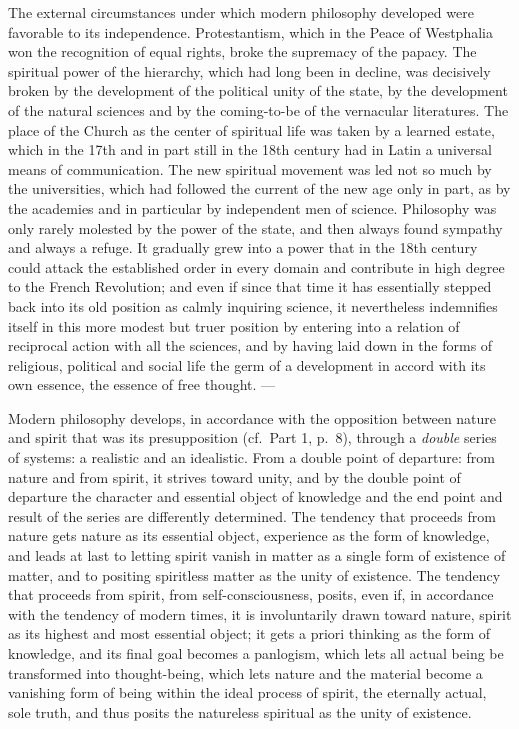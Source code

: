 The external circumstances under which modern philosophy developed were
favorable to its independence. Protestantism, which in the Peace of
Westphalia won the recognition of equal rights, broke the supremacy of
the papacy. The spiritual power of the hierarchy, which had long been in
decline, was decisively broken by the development of the political unity
of the state, by the development of the natural sciences and by the
coming-to-be of the vernacular literatures. The place of the Church as
the center of spiritual life was taken by a learned estate, which in the
17th and in part still in the 18th century had in Latin a universal
means of communication. The new spiritual movement was led not so much
by the universities, which had followed the current of the new age only
in part, as by the academies and in particular by independent men of
science. Philosophy was only rarely molested by the power of the state,
and then always found sympathy and always a refuge. It gradually grew
into a power that in the 18th century could attack the established order
in every domain and contribute in high degree to the French Revolution;
and even if since that time it has essentially stepped back into its old
position as calmly inquiring science, it nevertheless indemnifies itself
in this more modest but truer position by entering into a relation of
reciprocal action with all the sciences, and by having laid down in the
forms of religious, political and social life the germ of a
development in accord with its own essence, the essence of free thought.
---

Modern philosophy develops, in accordance with the opposition between
nature and spirit that was its presupposition (cf.\ Part 1, p.~8),
through a \emph{double} series of systems: a realistic and an
idealistic. From a double point of departure: from nature and from
spirit, it strives toward unity, and by the double point of departure
the character and essential object of knowledge and the end point and
result of the series are differently determined. The tendency that
proceeds from nature gets nature as its essential object, experience as
the form of knowledge, and leads at last to letting spirit vanish in
matter as a single form of existence of matter, and to positing
spiritless matter as the unity of existence. The tendency that proceeds
from spirit, from self-consciousness, posits, even if, in accordance
with the tendency of modern times, it is involuntarily drawn toward
nature, spirit as its highest and most essential object; it gets a
priori thinking as the form of knowledge, and its final goal becomes a
panlogism, which lets all actual being be transformed into thought-being,
which lets nature and the material become a vanishing form of being
within the ideal process of spirit, the eternally actual, sole truth,
and thus posits the natureless spiritual as the unity of existence.

